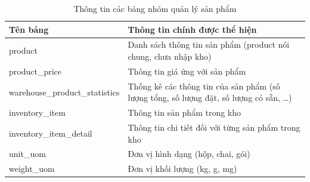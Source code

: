 \begin{table}[H]
\centering
\begin{tabular}{| m{6cm} | m{10cm} |}
\hline
\textbf{Tên bảng} & \textbf{Thông tin chính được thể hiện} \\
\hline

product &
Danh sách thông tin sản phẩm (product nói chung, chưa nhập kho) \\
\hline
product\_price &
Thông tin giá ứng với sản phẩm \\
\hline
warehouse\_product\_statistics &
Thống kê các thông tin của sản phẩm
(số lượng tổng, số lượng đặt, số lượng có sẵn, …) \\
\hline
inventory\_item &
Thông tin sản phẩm trong kho  \\
\hline
inventory\_item\_detail &
Thông tin chi tiết đối với từng sản phẩm trong kho \\
\hline
unit\_uom &
Đơn vị hình dạng (hộp, chai, gói) \\
\hline
weight\_uom &
Đơn vị khối lượng (kg, g, mg) \\

\hline
\end{tabular}
\caption{Thông tin các bảng nhóm quản lý sản phẩm}
\label{tab:dbproduct}
\end{table}


